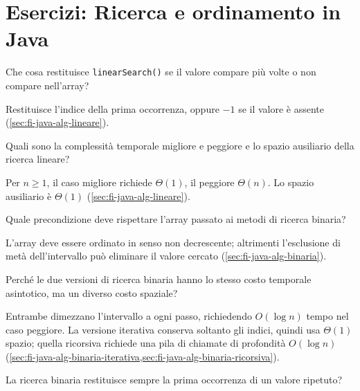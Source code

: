 \chapter{Esercizi: Ricerca e ordinamento in Java}
\label{chap:esercizi-ricerca-ordinamento-java}

\begin{exercise}
\label{ex:fi-esercizi-java-alg-linear-prima}
Che cosa restituisce \texttt{linearSearch()} se il valore compare
più volte o non compare nell'array?
\end{exercise}

Restituisce l'indice della prima occorrenza, oppure \(-1\) se il
valore è assente (\cref{sec:fi-java-alg-lineare}).

\begin{exercise}
\label{ex:fi-esercizi-java-alg-linear-costi}
Quali sono la complessità temporale migliore e peggiore e lo
spazio ausiliario della ricerca lineare?
\end{exercise}

Per \(n\ge1\), il caso migliore richiede \(\Theta(1)\), il peggiore
\(\Theta(n)\). Lo spazio ausiliario è \(\Theta(1)\)
(\cref{sec:fi-java-alg-lineare}).

\begin{exercise}
\label{ex:fi-esercizi-java-alg-binaria-precondizione}
Quale precondizione deve rispettare l'array passato ai metodi
di ricerca binaria?
\end{exercise}

L'array deve essere ordinato in senso non decrescente; altrimenti
l'esclusione di metà dell'intervallo può eliminare il valore
cercato (\cref{sec:fi-java-alg-binaria}).

\begin{exercise}
\label{ex:fi-esercizi-java-alg-binaria-spazio}
Perché le due versioni di ricerca binaria hanno lo stesso costo
temporale asintotico, ma un diverso costo spaziale?
\end{exercise}

Entrambe dimezzano l'intervallo a ogni passo, richiedendo
\(O(\log n)\) tempo nel caso peggiore. La versione iterativa
conserva soltanto gli indici, quindi usa \(\Theta(1)\) spazio;
quella ricorsiva richiede una pila di chiamate di profondità
\(O(\log n)\)
(\cref{sec:fi-java-alg-binaria-iterativa,sec:fi-java-alg-binaria-ricorsiva}).

\begin{exercise}
\label{ex:fi-esercizi-java-alg-binaria-duplicati}
La ricerca binaria restituisce sempre la prima occorrenza di un
valore ripetuto?
\end{exercise}

